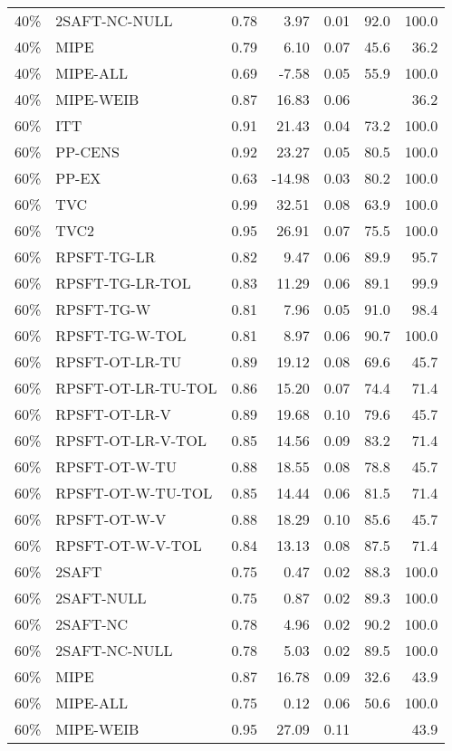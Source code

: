 \begin{table}[ht]
{\begin{tabular}{llrrrrr}
  40\% & 2SAFT-NC-NULL & 0.78 & 3.97 & 0.01 & 92.0 & 100.0 \\ 
  40\% & MIPE & 0.79 & 6.10 & 0.07 & 45.6 & 36.2 \\ 
  40\% & MIPE-ALL & 0.69 & -7.58 & 0.05 & 55.9 & 100.0 \\ 
  40\% & MIPE-WEIB & 0.87 & 16.83 & 0.06 &  & 36.2 \\ 
   \hline
60\% & ITT & 0.91 & 21.43 & 0.04 & 73.2 & 100.0 \\ 
  60\% & PP-CENS & 0.92 & 23.27 & 0.05 & 80.5 & 100.0 \\ 
  60\% & PP-EX & 0.63 & -14.98 & 0.03 & 80.2 & 100.0 \\ 
  60\% & TVC & 0.99 & 32.51 & 0.08 & 63.9 & 100.0 \\ 
  60\% & TVC2 & 0.95 & 26.91 & 0.07 & 75.5 & 100.0 \\ 
   \hline
60\% & RPSFT-TG-LR & 0.82 & 9.47 & 0.06 & 89.9 & 95.7 \\ 
  60\% & RPSFT-TG-LR-TOL & 0.83 & 11.29 & 0.06 & 89.1 & 99.9 \\ 
  60\% & RPSFT-TG-W & 0.81 & 7.96 & 0.05 & 91.0 & 98.4 \\ 
  60\% & RPSFT-TG-W-TOL & 0.81 & 8.97 & 0.06 & 90.7 & 100.0 \\ 
  60\% & RPSFT-OT-LR-TU & 0.89 & 19.12 & 0.08 & 69.6 & 45.7 \\ 
  60\% & RPSFT-OT-LR-TU-TOL & 0.86 & 15.20 & 0.07 & 74.4 & 71.4 \\ 
  60\% & RPSFT-OT-LR-V & 0.89 & 19.68 & 0.10 & 79.6 & 45.7 \\ 
  60\% & RPSFT-OT-LR-V-TOL & 0.85 & 14.56 & 0.09 & 83.2 & 71.4 \\ 
   \hline
60\% & RPSFT-OT-W-TU & 0.88 & 18.55 & 0.08 & 78.8 & 45.7 \\ 
  60\% & RPSFT-OT-W-TU-TOL & 0.85 & 14.44 & 0.06 & 81.5 & 71.4 \\ 
  60\% & RPSFT-OT-W-V & 0.88 & 18.29 & 0.10 & 85.6 & 45.7 \\ 
  60\% & RPSFT-OT-W-V-TOL & 0.84 & 13.13 & 0.08 & 87.5 & 71.4 \\ 
   \hline
60\% & 2SAFT & 0.75 & 0.47 & 0.02 & 88.3 & 100.0 \\ 
  60\% & 2SAFT-NULL & 0.75 & 0.87 & 0.02 & 89.3 & 100.0 \\ 
  60\% & 2SAFT-NC & 0.78 & 4.96 & 0.02 & 90.2 & 100.0 \\ 
  60\% & 2SAFT-NC-NULL & 0.78 & 5.03 & 0.02 & 89.5 & 100.0 \\ 
  60\% & MIPE & 0.87 & 16.78 & 0.09 & 32.6 & 43.9 \\ 
  60\% & MIPE-ALL & 0.75 & 0.12 & 0.06 & 50.6 & 100.0 \\ 
  60\% & MIPE-WEIB & 0.95 & 27.09 & 0.11 &  & 43.9 \\ 
   \hline
\end{tabular}
}
\end{table}
